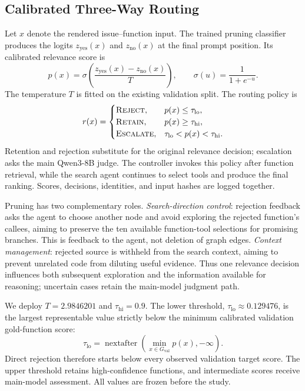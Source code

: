 \documentclass{svproc}
\newcommand{\low}{\tau_{\mathrm{lo}}}
\newcommand{\high}{\tau_{\mathrm{hi}}}
\begin{document}
\subsection{Calibrated Three-Way Routing}
Let $x$ denote the rendered issue--function input. The trained pruning classifier produces the logits $z_{\mathrm{yes}}(x)$ and $z_{\mathrm{no}}(x)$ at the final prompt position. Its calibrated relevance score is
\begin{equation}
 p(x)=\sigma\!\left(\frac{z_{\mathrm{yes}}(x)-z_{\mathrm{no}}(x)}{T}\right),
 \qquad \sigma(u)=\frac{1}{1+e^{-u}}.
 \label{eq:score}
\end{equation}
The temperature $T$ is fitted on the existing validation split. The routing policy is
\begin{equation}
 r(x)=\begin{cases}
 \textsc{Reject}, & p(x)\leq\low,\\
 \textsc{Retain}, & p(x)\geq\high,\\
 \textsc{Escalate}, & \low<p(x)<\high.
 \end{cases}
 \label{eq:route}
\end{equation}
Retention and rejection substitute for the original relevance decision; escalation asks the main Qwen3-8B judge. The controller invokes this policy after function retrieval, while the search agent continues to select tools and produce the final ranking. Scores, decisions, identities, and input hashes are logged together.

Pruning has two complementary roles. \emph{Search-direction control}: rejection feedback asks the agent to choose another node and avoid exploring the rejected function's callees, aiming to preserve the ten available function-tool selections for promising branches. This is feedback to the agent, not deletion of graph edges. \emph{Context management}: rejected source is withheld from the search context, aiming to prevent unrelated code from diluting useful evidence. Thus one relevance decision influences both subsequent exploration and the information available for reasoning; uncertain cases retain the main-model judgment path.

We deploy $T=2.9846201$ and $\high=0.9$. The lower threshold, $\low\approx0.129476$, is the largest representable value strictly below the minimum calibrated validation gold-function score:
\begin{equation}
 \low=\operatorname{nextafter}\!\left(\min_{x\in G_{\mathrm{val}}}p(x),-\infty\right).
 \label{eq:threshold}
\end{equation}
Direct rejection therefore starts below every observed validation target score. The upper threshold retains high-confidence functions, and intermediate scores receive main-model assessment. All values are frozen before the study.
\end{document}
